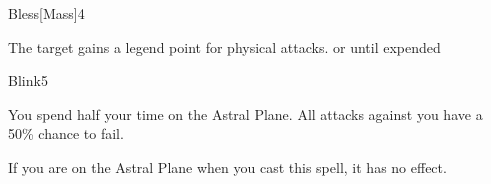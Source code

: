 \begin{spellsection}{Bless}[Mass]{4}
\begin{spellheader}
\end{spellheader}
\begin{spellcontent}
    \begin{spelltargetinginfo}
    \end{spelltargetinginfo}
    \begin{spelleffects}
        \spelleffect The target gains a legend point for physical attacks.
        \spelldur \durshort or until expended
    \end{spelleffects}
\end{spellcontent}
\begin{spellfooter}
\end{spellfooter}
\end{spellsection}

\begin{spellsection}{Blink}{5}
\begin{spellheader}
\end{spellheader}
\begin{spellcontent}
    \begin{spelltargetinginfo}
    \end{spelltargetinginfo}
    \begin{spelleffects}
        \spelleffect You spend half your time on the Astral Plane. All attacks against you have a 50\% chance to fail.
        \spelldur \durshort \dismissable
    \end{spelleffects}
\end{spellcontent}
\begin{spellfooter}
    \spellnotes If you are on the Astral Plane when you cast this spell, it has no effect.
\end{spellfooter}
\end{spellsection}

